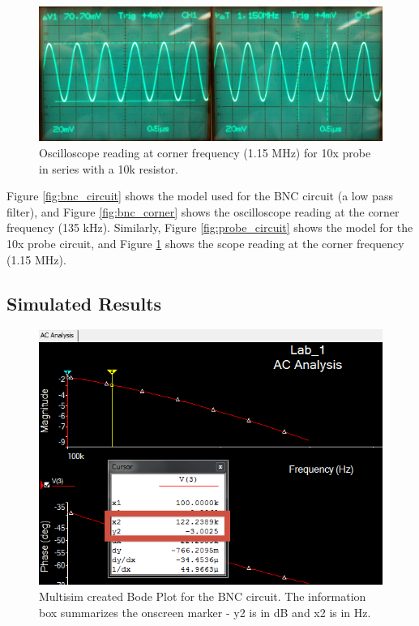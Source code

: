 \documentclass[12pt,letterpaper]{report}
\newlength \figwidth
\begin{document}
\begin{figure}
	\centering
	\includegraphics[width=\linewidth, keepaspectratio=true]{lab1_images/10x_sine_corner.png} 
	\caption{Oscilloscope reading at corner frequency (1.15 MHz) for 10x probe in series with a 10k resistor. }
	\label{fig:probe_corner}
\end{figure}

Figure \ref{fig:bnc_circuit} shows the model used for the BNC circuit (a low pass filter), and Figure \ref{fig:bnc_corner} shows the oscilloscope reading at the corner frequency (135 kHz). Similarly, Figure \ref{fig:probe_circuit} shows the model for the 10x probe circuit, and Figure \ref{fig:probe_corner} shows the scope reading at the corner frequency (1.15 MHz).

\subsection*{Simulated Results}

\begin{figure}
	\centering
	\includegraphics[width=\figwidth, keepaspectratio=true]{lab1_images/BNC_bode.png} 
	\caption{Multisim created Bode Plot for the BNC circuit. The information box summarizes the onscreen marker - y2 is in dB and x2 is in Hz. }
	\label{fig:bnc_bode}
\end{figure}
\end{document}
